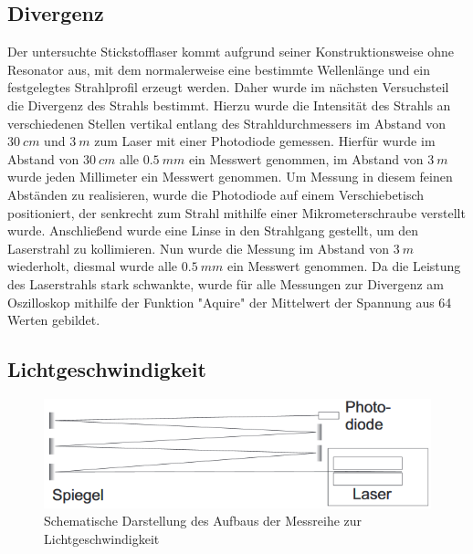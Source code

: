 \documentclass[
	a4paper,
	12pt,
	pagesize,
	ngerman
]{scrartcl}
\begin{document}
\subsection{Divergenz}
Der untersuchte Stickstofflaser kommt aufgrund seiner Konstruktionsweise ohne Resonator aus, mit dem normalerweise eine bestimmte Wellenlänge und ein festgelegtes Strahlprofil erzeugt werden. Daher wurde im nächsten Versuchsteil die Divergenz des Strahls bestimmt. Hierzu wurde die Intensität des Strahls an verschiedenen Stellen vertikal entlang des Strahldurchmessers im Abstand von $\SI{30}{cm}$ und $\SI{3}{m}$ zum Laser mit einer Photodiode gemessen. Hierfür wurde im Abstand von $\SI{30}{cm}$ alle $\SI{0,5}{mm}$ ein Messwert genommen, im Abstand von $\SI{3}{m}$ wurde jeden Millimeter ein Messwert genommen. Um Messung in diesem feinen Abständen zu realisieren, wurde die Photodiode auf einem Verschiebetisch positioniert, der senkrecht zum Strahl mithilfe einer Mikrometerschraube verstellt wurde.
Anschließend wurde eine Linse in den Strahlgang gestellt, um den Laserstrahl zu kollimieren. Nun wurde die Messung im Abstand von $\SI{3}{m}$ wiederholt, diesmal wurde alle $\SI{0,5}{mm}$ ein Messwert genommen. Da die Leistung des Laserstrahls stark schwankte, wurde für alle Messungen zur Divergenz am Oszilloskop mithilfe der Funktion "Aquire" der Mittelwert der Spannung aus 64 Werten gebildet.

\subsection{Lichtgeschwindigkeit}
\begin{figure}[h!]
	\centering
	\includegraphics[scale=0.9]{skizze_c.png}
	\caption{Schematische Darstellung des Aufbaus der Messreihe zur Lichtgeschwindigkeit}
	\label{skizze_c}
\end{figure}
\end{document}
